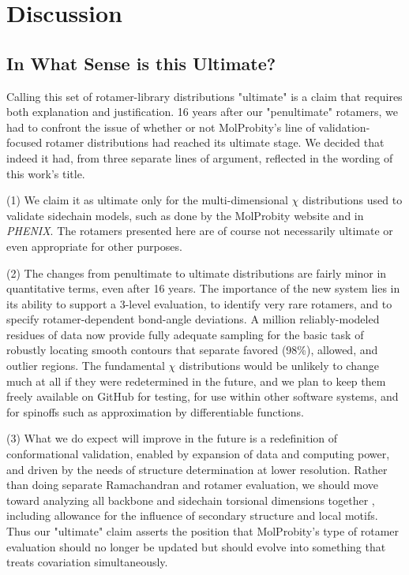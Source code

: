 \section{Discussion}

\subsection{In What Sense is this Ultimate?}
Calling this set of rotamer-library distributions "ultimate" is a claim that requires both explanation and justification. \textcolor{changecolor}{16 years after our "penultimate" rotamers, we had to confront the issue of whether or not MolProbity's line of validation-focused rotamer distributions had reached its ultimate stage. We decided that indeed it had, from three separate lines of argument, reflected in the wording of this work's title}.

\textcolor{changecolor}{(1) 
We claim it as ultimate only for the multi-dimensional $\chi$ distributions used to validate sidechain models, such as done by the MolProbity website and in \textit{PHENIX}. The rotamers presented here are of course not necessarily ultimate or even appropriate for other purposes.}

\textcolor{changecolor}{(2) The c}hanges from penultimate to ultimate distributions are fairly minor in quantitative terms, \textcolor{changecolor}{even after 16 years.} The importance of the new system lies in its ability to support a 3-level evaluation, to identify very rare rotamers, and to specify rotamer-dependent bond-angle deviations.  A million \textcolor{changecolor}{reliably-modeled residues of data now} provide fully adequate sampling for the basic task of robustly locating smooth contours that separate favored (98\%), allowed, and outlier regions. The fundamental $\chi$ distributions would be unlikely to change \textcolor{changecolor}{much at all if they were redetermined in the future, and we plan to keep them freely available on GitHub for testing, for use within other software systems, and for spinoffs such as approximation by differentiable functions.}

\textcolor{changecolor}{(3)  W}hat we do expect will improve in the future is a redefinition of conformational validation, enabled by expansion of data and computing power, and \textcolor{changecolor}{driven by} the needs of structure determination at lower resolution. Rather than doing separate Ramachandran and rotamer evaluation, we should move toward analyzing all backbone and sidechain torsional dimensions together \cite{JSR_theplot_2013}, including allowance for the influence of secondary structure and local motifs. Thus our "ultimate" claim asserts the position that \textcolor{changecolor}{MolProbity's type of }rotamer evaluation should no longer be updated but should evolve into something \textcolor{changecolor}{that treats covariation simultaneously}.

